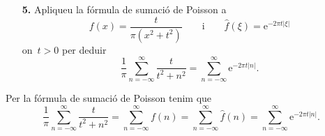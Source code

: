 \documentclass[a4paper]{article}
\theoremstyle{plain}
\newcommand{\e}{\mathrm{e}}
\providecommand{\uppi}{\pi}
\newcommand{\abs}[1]{\lvert{#1}\rvert}
\begin{document}
\clearpage

\begin{enumerate}
    \item[\textbf{5.}] Apliqueu la fórmula de sumació de Poisson a
        \[
            f(x) = \frac{t}{\uppi(x^{2}+t^{2})}
            \qquad
            \text{i}
            \qquad
            \widehat{f}(\xi) = \e^{-2\uppi t\abs{\xi}}
        \]
        on~\(t>0\) per deduir
        \[
            \frac{1}{\uppi}
            \sum_{n=-\infty}^{\infty}
            \frac{t}{t^{2}+n^{2}}
            =
            \sum_{n=-\infty}^{\infty}
            \e^{-2\uppi t\abs{n}}.
        \]
\end{enumerate}

Per la fórmula de sumació de Poisson tenim que
\[
    \frac{1}{\uppi}
    \sum_{n=-\infty}^{\infty}
    \frac{t}{t^{2}+n^{2}}
    =
    \sum_{n=-\infty}^{\infty} f(n)
    =
    \sum_{n=-\infty}^{\infty} \widehat{f}(n)
    =
    \sum_{n=-\infty}^{\infty}
    \e^{-2\uppi t\abs{n}}.
\]
\end{document}
